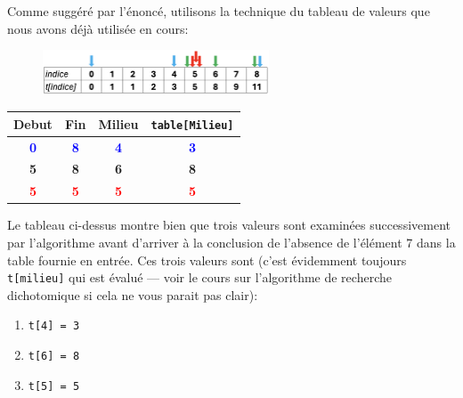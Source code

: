 \documentclass[11pt,a4paper]{exam}
\begin{document}
\begin{questions}
\begin{spacing}{1}
\begin{parts}
			\begin{solution}
				Comme suggéré par l'énoncé, utilisons la technique du tableau de valeurs que nous avons déjà utilisée en cours:
				\begin{center}				
					\begin{figure}[H]
						\centering
						\includegraphics[width=0.6\textwidth]{RechDich.png}
					\end{figure}
					
					\begin{tabular}{|c|c|c|c|}
						\hline
						\textbf{Debut} & \textbf{Fin} & \textbf{Milieu} & \textbf{\texttt{table[Milieu]}}\\
						\hline
						\textbf{\textcolor{blue}{0}} & \textbf{\textcolor{blue}{8}} & \textbf{\textcolor{blue}{4}} & \textbf{\textcolor{blue}{3}}\\
						\hline 
						\textbf{\textcolor{mongreen}{5}} & \textbf{\textcolor{mongreen}{8}} & \textbf{\textcolor{mongreen}{6}} & \textbf{\textcolor{mongreen}{8}} \\
						\hline 
						\textbf{\textcolor{red}{5}} & \textbf{\textcolor{red}{5}} & \textbf{\textcolor{red}{5}} & \textbf{\textcolor{red}{5}} \\
						\hline
					\end{tabular}
				\end{center}
				
				\vspace{\baselineskip}
				Le tableau ci-dessus montre bien que trois valeurs sont examinées successivement par l'algorithme avant d'arriver à la conclusion de l'absence de l'élément 7 dans la table fournie en entrée. Ces trois valeurs sont (c'est évidemment toujours \texttt{t[milieu]} qui est évalué --- voir le cours sur l'algorithme de recherche dichotomique si cela ne vous parait pas clair):
				\begin{enumerate}
					\item \texttt{t[4] = 3}
					\item \texttt{t[6] = 8}
					\item \texttt{t[5] = 5}
				\end{enumerate}
			\end{solution}
		\end{parts}
			

\end{spacing}
\end{questions}
\end{document}
